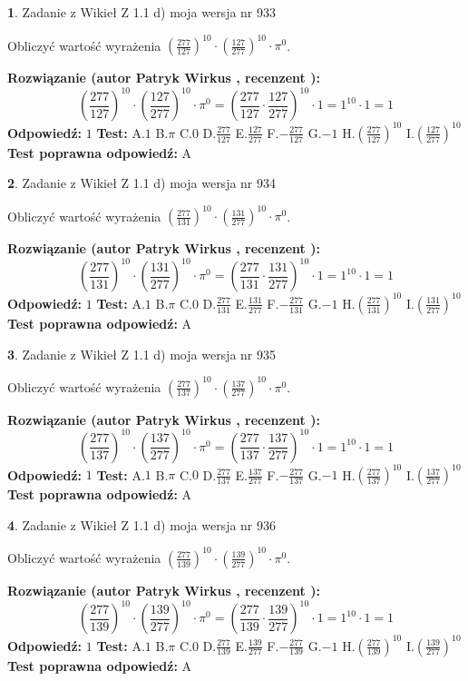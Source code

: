 \documentclass[12pt, a4paper]{article}
\theoremstyle{definition} %
\newtheorem{zad}{}
\newcommand{\zadStart}[1]{\begin{zad}#1\newline}
\newcommand{\zadStop}{\end{zad}}
\newcommand{\rozwStart}[2]{\noindent \textbf{Rozwiązanie (autor #1 , recenzent #2): }\newline}
\newcommand{\rozwStop}{\newline}
\newcommand{\odpStart}{\noindent \textbf{Odpowiedź:}\newline}
\newcommand{\odpStop}{\newline}
\newcommand{\testStart}{\noindent \textbf{Test:}\newline}
\newcommand{\testStop}{\newline}
\newcommand{\kluczStart}{\noindent \textbf{Test poprawna odpowiedź:}\newline}
\newcommand{\kluczStop}{\newline}
\begin{document}
\zadStart{Zadanie z Wikieł Z 1.1 d) moja wersja nr 933}

Obliczyć wartość wyrażenia $(\frac{277}{127})^{10} \cdot (\frac{127}{277})^{10} \cdot \pi^{0}$.
\zadStop
\rozwStart{Patryk Wirkus}{}
$$(\frac{277}{127})^{10} \cdot (\frac{127}{277})^{10} \cdot \pi^{0} = (\frac{277}{127} \cdot \frac{127}{277})^{10} \cdot 1 = 1^{10} \cdot 1 = 1$$
\rozwStop
\odpStart
$1$
\odpStop
\testStart
A.$1$ B.$\pi$ C.$0$ D.$\frac{277}{127}$ E.$\frac{127}{277}$
F.$-\frac{277}{127}$ G.$-1$
H.$(\frac{277}{127})^{10}$
I.$(\frac{127}{277})^{10}$
\testStop
\kluczStart
A
\kluczStop



\zadStart{Zadanie z Wikieł Z 1.1 d) moja wersja nr 934}

Obliczyć wartość wyrażenia $(\frac{277}{131})^{10} \cdot (\frac{131}{277})^{10} \cdot \pi^{0}$.
\zadStop
\rozwStart{Patryk Wirkus}{}
$$(\frac{277}{131})^{10} \cdot (\frac{131}{277})^{10} \cdot \pi^{0} = (\frac{277}{131} \cdot \frac{131}{277})^{10} \cdot 1 = 1^{10} \cdot 1 = 1$$
\rozwStop
\odpStart
$1$
\odpStop
\testStart
A.$1$ B.$\pi$ C.$0$ D.$\frac{277}{131}$ E.$\frac{131}{277}$
F.$-\frac{277}{131}$ G.$-1$
H.$(\frac{277}{131})^{10}$
I.$(\frac{131}{277})^{10}$
\testStop
\kluczStart
A
\kluczStop



\zadStart{Zadanie z Wikieł Z 1.1 d) moja wersja nr 935}

Obliczyć wartość wyrażenia $(\frac{277}{137})^{10} \cdot (\frac{137}{277})^{10} \cdot \pi^{0}$.
\zadStop
\rozwStart{Patryk Wirkus}{}
$$(\frac{277}{137})^{10} \cdot (\frac{137}{277})^{10} \cdot \pi^{0} = (\frac{277}{137} \cdot \frac{137}{277})^{10} \cdot 1 = 1^{10} \cdot 1 = 1$$
\rozwStop
\odpStart
$1$
\odpStop
\testStart
A.$1$ B.$\pi$ C.$0$ D.$\frac{277}{137}$ E.$\frac{137}{277}$
F.$-\frac{277}{137}$ G.$-1$
H.$(\frac{277}{137})^{10}$
I.$(\frac{137}{277})^{10}$
\testStop
\kluczStart
A
\kluczStop



\zadStart{Zadanie z Wikieł Z 1.1 d) moja wersja nr 936}

Obliczyć wartość wyrażenia $(\frac{277}{139})^{10} \cdot (\frac{139}{277})^{10} \cdot \pi^{0}$.
\zadStop
\rozwStart{Patryk Wirkus}{}
$$(\frac{277}{139})^{10} \cdot (\frac{139}{277})^{10} \cdot \pi^{0} = (\frac{277}{139} \cdot \frac{139}{277})^{10} \cdot 1 = 1^{10} \cdot 1 = 1$$
\rozwStop
\odpStart
$1$
\odpStop
\testStart
A.$1$ B.$\pi$ C.$0$ D.$\frac{277}{139}$ E.$\frac{139}{277}$
F.$-\frac{277}{139}$ G.$-1$
H.$(\frac{277}{139})^{10}$
I.$(\frac{139}{277})^{10}$
\testStop
\kluczStart
A
\kluczStop
\end{document}
